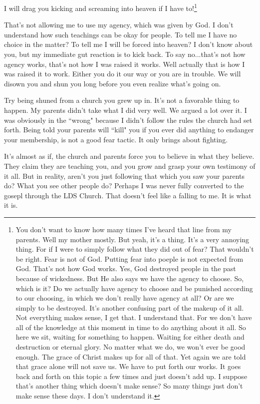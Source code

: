 \begin{displayquote}
I will drag you kicking and screaming into heaven if I have to!\footnote{
You don't want to know how many times I've heard that line from my parents. Well
my mother mostly. But yeah, it's a thing. It's a very annoying thing. For if I
were to simply follow what they did out of fear? That wouldn't be right. Fear is
not of God. Putting fear into poeple is not expected from God. That's not how
God works. Yes, God destroyed people in the past because of wickedness. But He
also says we have the agency to choose. So, which is it? Do we actually have
agency to choose and be punished according to our choosing, in which we don't
really have agency at all? Or are we simply to be destroyed. It's another
confusing part of the makeup of it all. Not everything makes sense, I get that.
I understand that. For we don't have all of the knowledge at this moment in time
to do anything about it all. So here we sit, waiting for something to happen.
Waiting for either death and destruction or eternal glory. No matter what we do,
we won't ever be good enough. The grace of Christ makes up for all of that. Yet
again we are told that grace alone will not save us. We have to put forth our
works. It goes back and forth on this topic a few times and just doesn't add up.
I suppose that's another thing which doesn't make sense? So many things just
don't make sense these days. I don't understand it.
}
\end{displayquote}

That's not allowing me to use my agency, which was given by God. I don't
understand how such teachings can be okay for people. To tell me I have no
choice in the matter? To tell me I will be forced into heaven? I don't know
about you, but my immediate gut reaction is to kick back. To say no...that's not
how agency works, that's not how I was raised it works. Well actually that is
how I was raised it to work. Either you do it our way or you are in trouble. We
will disown you and shun you long before you even realize what's going on.

Try being shuned from a church you grew up in. It's not a favorable thing to
happen. My parents didn't take what I did very well. We argued a lot over it. I
was obviously in the ``wrong" because I didn't follow the rules the church had
set forth. Being told your parents will ``kill" you if you ever did anything to
endanger your membership, is not a good fear tactic. It only brings about
fighting.

It's almost as if, the church and parents force you to believe in what they
believe. They claim they are teaching you, and you grow and grasp your own
testimony of it all. But in reality, aren't you just following that which you
saw your parents do? What you see other people do? Perhaps I was never fully
converted to the gosepl through the LDS Church. That doesn't feel like a falling
to me. It is what it is.

